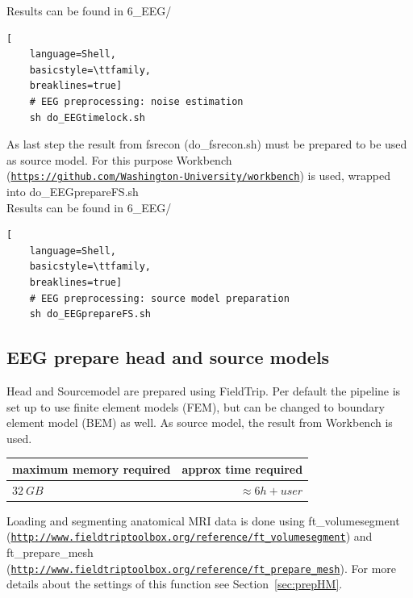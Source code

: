 \documentclass[12pt,a4paper]{scrartcl}
\begin{document}
\noindent Results can be found in 6\_EEG/\\
\begin{lstlisting}[
    language=Shell,
    basicstyle=\ttfamily,
    breaklines=true]
    # EEG preprocessing: noise estimation
    sh do_EEGtimelock.sh
\end{lstlisting}
As last step the result from fsrecon (do\_fsrecon.sh) must be prepared to be used as source model. For this purpose Workbench (\href{https://github.com/Washington-University/workbench}{\nolinkurl{https://github.com/Washington-University/workbench}}) is used, wrapped into do\_EEGprepareFS.sh\\

\noindent Results can be found in 6\_EEG/\\
\begin{lstlisting}[
    language=Shell,
    basicstyle=\ttfamily,
    breaklines=true]
    # EEG preprocessing: source model preparation
    sh do_EEGprepareFS.sh
\end{lstlisting}


\subsection{EEG prepare head and source models}
Head and Sourcemodel are prepared using FieldTrip. Per default the pipeline is set up to use finite element models (FEM), but can be changed to boundary element model (BEM) as well. As source model, the result from Workbench is used.
\label{sec:Sourcemodel}
\begin{table}[h]
\begin{tabular}{l | r}
\toprule
maximum memory required & approx time required\\\toprule
$32~GB$ & $\approx 6h+user$ \\\bottomrule
\end{tabular}
\end{table}
Loading and segmenting anatomical MRI data is done using ft\_volumesegment (\href{http://www.fieldtriptoolbox.org/reference/ft\_volumesegment}{\nolinkurl{http://www.fieldtriptoolbox.org/reference/ft\_volumesegment}}) and ft\_prepare\_mesh (\href{http://www.fieldtriptoolbox.org/reference/ft\_prepare\_mesh}{\nolinkurl{http://www.fieldtriptoolbox.org/reference/ft\_prepare\_mesh}}). For more details about the settings of this function see Section~\ref{sec:prepHM}.\\
\end{document}
